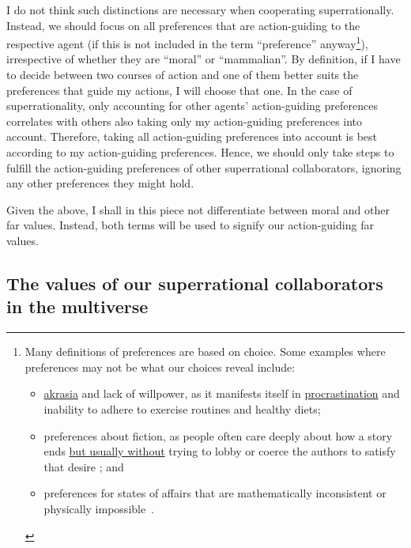 I do not think such distinctions are necessary when cooperating
superrationally. Instead, we should focus on all preferences that are
action-guiding to the respective agent (if this is not included in the
term ``preference'' anyway\footnote{Many definitions of preferences are
    based on choice.
  Some examples where preferences
  may not be what our choices reveal include:
  \begin{itemize}
  \item
  \href{https://en.wikipedia.org/wiki/Akrasia}{akrasia} and lack
  of willpower, as it manifests itself in
  \href{https://en.wikipedia.org/wiki/Procrastination}{procrastination}
  and inability to adhere to exercise routines and healthy diets;

  \item
  preferences about fiction, as people often care deeply about how a
  story ends
  \href{http://briantomasik.com/collection-quick-observations/\#Taking_fiction_seriously}{but
  usually without} trying to lobby or coerce the authors to satisfy
  that desire
  \parencite{Radford1975-my,noauthor_undated-sw}; and

  \item preferences for states of affairs that are mathematically inconsistent
  or physically impossible~\parencite{Oesterheld2017}. 
  \end{itemize}
  }), irrespective of whether they are ``moral'' or
``mammalian''. By definition, if I have to decide between two courses of
action and one of them better suits the preferences that guide my
actions, I will choose that one. In the case of superrationality, only
accounting for other agents' action-guiding preferences correlates with
others also taking only my action-guiding preferences into account.
Therefore, taking all action-guiding preferences into account is best
according to my action-guiding preferences. Hence, we should only take
steps to fulfill the action-guiding preferences of other superrational
collaborators, ignoring any other preferences they might hold.

Given the above, I shall in this piece not differentiate between moral
and other far values. Instead, both terms will be used to signify our
action-guiding far values.

\hypertarget{the-values-of-our-superrational-collaborators-in-the-multiverse}{\subsection{The
values of our superrational collaborators in the
multiverse}\label{the-values-of-our-superrational-collaborators-in-the-multiverse}}

